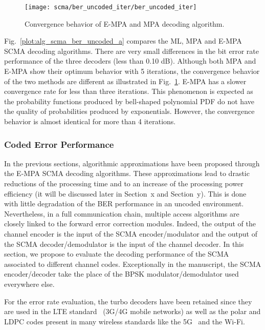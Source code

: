 \begin{figure}[htp]
  \centering
  \texttt{[image: scma/ber\_uncoded\_iter/ber\_uncoded\_iter]}
  \caption{Convergence behavior of E-MPA and MPA decoding algorithm.}
  \label{plot:alg_scma_ber_uncoded_b}
\end{figure}

Fig.~\ref{plot:alg_scma_ber_uncoded_a} compares the ML, MPA and E-MPA SCMA
decoding algorithms. There are very small differences in the bit error rate
performance of the three decoders (less than 0.10 dB). Although both MPA and
E-MPA show their optimum behavior with 5 iterations, the convergence behavior of
the two methods are different as illustrated in
Fig.~\ref{plot:alg_scma_ber_uncoded_b}. E-MPA has a slower convergence rate for
less than three iterations. This phenomenon is expected as the probability
functions produced by bell-shaped polynomial PDF do not have the quality of
probabilities produced by exponentials. However, the convergence behavior is
almost identical for more than 4 iterations.

\subsubsection{Coded Error Performance}
\label{sec:alg_scma_fec}

In the previous sections, algorithmic approximations have been proposed through
the E-MPA SCMA decoding algorithms. These approximations lead to drastic
reductions of the processing time and to an increase of the processing power
efficiency (it will be discussed later in Section~x and Section~y). This is done
with little degradation of the BER performance in an uncoded environment.
Nevertheless, in a full communication chain, multiple access algorithms are
closely linked to the forward error correction modules. Indeed, the output of
the channel encoder is the input of the SCMA encoder/modulator and the output of
the SCMA decoder/demodulator is the input of the channel decoder. In this
section, we propose to evaluate the decoding performance of the SCMA associated
to different channel codes. Exceptionally in the manuscript, the SCMA
encoder/decoder take the place of the BPSK modulator/demodulator used everywhere
else.

For the error rate evaluation, the turbo decoders have been retained since they
are used in the LTE standard~\cite{ETSI2013} (3G/4G mobile networks) as well
as the polar and LDPC codes present in many wireless standards like the
5G~\cite{ETSI2018} and the Wi-Fi.

